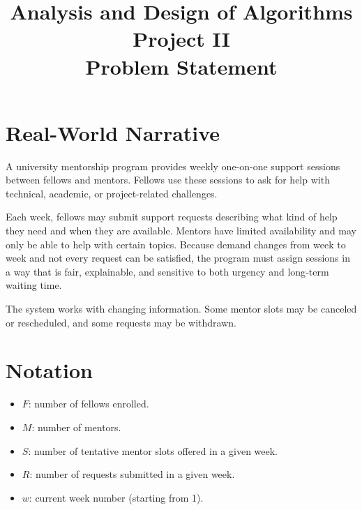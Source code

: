 \documentclass[12pt]{article}
\title{Analysis and Design of Algorithms\\Project II\\Problem Statement}
\author{}
\date{}
\begin{document}
\maketitle

\section*{Real-World Narrative}

A university mentorship program provides weekly one-on-one support sessions between fellows and mentors. Fellows use these sessions to ask for help with technical, academic, or project-related challenges.

Each week, fellows may submit support requests describing what kind of help they need and when they are available. Mentors have limited availability and may only be able to help with certain topics. Because demand changes from week to week and not every request can be satisfied, the program must assign sessions in a way that is fair, explainable, and sensitive to both urgency and long‑term waiting time.

The system works with changing information. Some mentor slots may be canceled or rescheduled, and some requests may be withdrawn.

\section*{Notation}

\begin{itemize}
\item $F$: number of fellows enrolled.
\item $M$: number of mentors.
\item $S$: number of tentative mentor slots offered in a given week.
\item $R$: number of requests submitted in a given week.
\item $w$: current week number (starting from 1).
\end{itemize}



\end{document}
